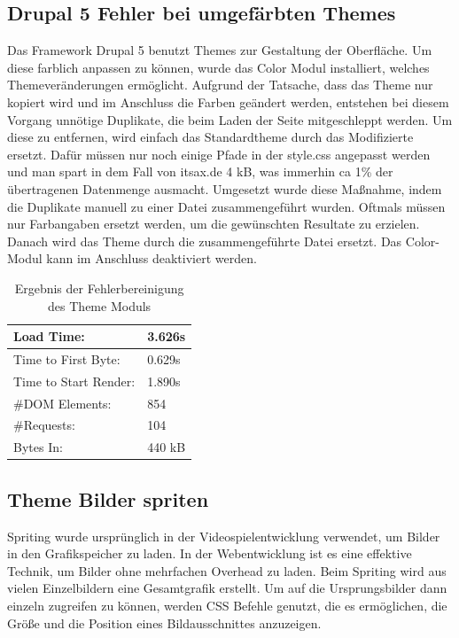
\subsection{Drupal 5 Fehler bei umgefärbten Themes}
Das Framework Drupal 5 benutzt Themes zur Gestaltung der Oberfläche. Um diese farblich anpassen zu können, wurde das Color Modul installiert, welches Themeveränderungen ermöglicht. Aufgrund der Tatsache, dass das Theme nur kopiert wird und im Anschluss die Farben geändert werden, entstehen bei diesem Vorgang unnötige Duplikate, die beim Laden der Seite mitgeschleppt werden. Um diese zu entfernen, wird einfach das Standardtheme durch das Modifizierte ersetzt. Dafür müssen  nur noch einige Pfade in der style.css angepasst werden und man spart in dem Fall von itsax.de 4 kB, was immerhin ca 1\% der übertragenen Datenmenge ausmacht. Umgesetzt wurde diese Ma\ss{}nahme, indem die Duplikate manuell zu einer Datei zusammengef\"uhrt wurden. Oftmals m\"ussen nur Farbangaben ersetzt werden, um die gew\"unschten Resultate zu erzielen. Danach wird das Theme durch die zusammengef\"uhrte Datei ersetzt. Das Color-Modul kann im Anschluss deaktiviert werden.

\begin{table}[!ht]
\centering
\caption{Ergebnis der Fehlerbereinigung des Theme Moduls}
    \begin{tabular}{ | p{3cm} | p{1.5cm} | }
    \hline
    Load Time: 			& 3.626s 	\\ \hline
    Time to First Byte:		& 0.629s  	\\ \hline
    Time to Start Render:	& 1.890s	\\ \hline
    \#DOM Elements:		& 854 		\\ \hline
    \#Requests:			& 104 		\\ \hline
    Bytes In:			& 440 kB 	\\ \hline
    \hline
    \end{tabular}
\end{table}

\subsection{Theme Bilder spriten}
Spriting wurde ursprünglich in der Videospielentwicklung verwendet, um Bilder in den Grafikspeicher zu laden. In der Webentwicklung ist es eine effektive Technik, um Bilder ohne mehrfachen Overhead zu laden. Beim Spriting wird aus vielen Einzelbildern eine Gesamtgrafik erstellt. Um auf die Ursprungsbilder dann einzeln zugreifen zu können, werden CSS Befehle genutzt, die es ermöglichen, die Größe und die Position eines Bildausschnittes anzuzeigen. 

